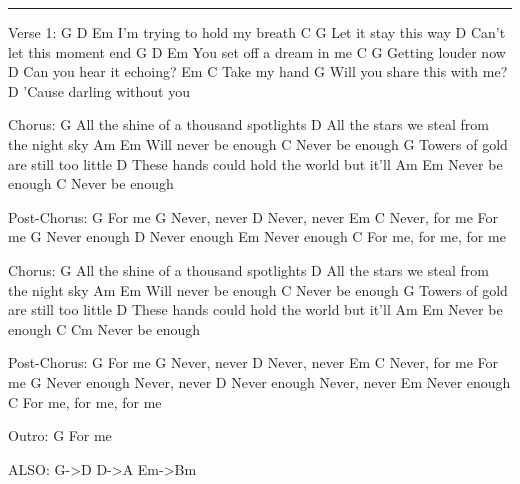 \noindent\rule{\columnwidth}{1pt}

\begin{multicols}{2}
\begin{lstsong}
Verse 1:
G             D           Em
I'm trying to hold my breath
        C        G
Let it stay this way
       D
Can't let this moment end
G             D        Em
You set off a dream in me
         C     G
Getting louder now
        D
Can you hear it echoing?
Em           C
Take my hand
                        G
Will you share this with me?
                   D
'Cause darling without you
 
Chorus:
G
All the shine of a thousand spotlights
D
All the stars we steal from the night sky
Am            Em
Will never be enough
C
Never be enough
G
Towers of gold are still too little
      D
These hands could hold the world but it'll
Am       Em
Never be enough
C
Never be enough
 
Post-Chorus:
G
For me
G
Never, never
D
Never, never
Em         C
Never, for me
For me
G
Never enough
D
Never enough
Em
Never enough
    C
For me, for me, for me
 
Chorus:
G
All the shine of a thousand spotlights
D
All the stars we steal from the night sky
    Am        Em
Will never be enough
C
Never be enough
G
Towers of gold are still too little
      D
These hands could hold the world but it'll
Am         Em
Never be enough
C             Cm
Never be enough
 
Post-Chorus:
G
For me
G
Never, never
D
Never, never
Em          C
Never, for me
For me
G
Never enough
Never, never
D
Never enough
Never, never
Em
Never enough
    C
For me, for me, for me
 
Outro:
G
For me

ALSO:
G->D
D->A
Em->Bm
\end{lstsong}
\end{multicols}
\newpage



